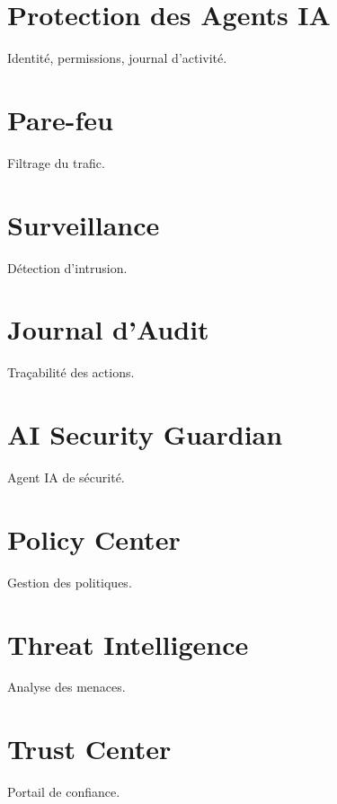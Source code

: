 \documentclass[12pt,a4paper,oneside]{book}
\begin{document}
\chapter{Protection des Agents IA}
Identité, permissions, journal d'activité.

\chapter{Pare-feu}
Filtrage du trafic.

\chapter{Surveillance}
Détection d'intrusion.

\chapter{Journal d'Audit}
Traçabilité des actions.

\chapter{AI Security Guardian}
Agent IA de sécurité.

\chapter{Policy Center}
Gestion des politiques.

\chapter{Threat Intelligence}
Analyse des menaces.

\chapter{Trust Center}
Portail de confiance.
\end{document}
